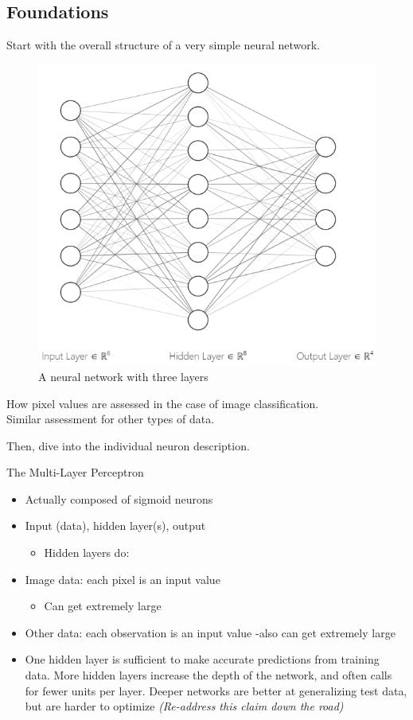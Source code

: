 

\hypertarget{foundations}{%
\subsection{Foundations}\label{foundations}}

Start with the overall structure of a very simple neural network.

\begin{figure}
    \centering
    \includegraphics[width=.4\textwidth]{ANN_files/NN_int.png}
    \caption*{\footnotesize{A neural network with three layers}}
\end{figure}

How pixel values are assessed in the case of image classification.\\
Similar assessment for other types of data.

Then, dive into the individual neuron description.

The Multi-Layer Perceptron

\begin{itemize}
\tightlist
\item
  Actually composed of sigmoid neurons
\item
  Input (data), hidden layer(s), output

  \begin{itemize}
  \tightlist
  \item
    Hidden layers do:
  \end{itemize}
\item
  Image data: each pixel is an input value

  \begin{itemize}
  \tightlist
  \item
    Can get extremely large
  \end{itemize}
\item
  Other data: each observation is an input value -also can get extremely
  large
\item
  One hidden layer is sufficient to make accurate predictions from
  training data. More hidden layers increase the depth of the network,
  and often calls for fewer units per layer. Deeper networks are better
  at generalizing test data, but are harder to optimize
  \cite{Goodfellow-et-al-2016} \emph{(Re-address this claim down the
  road)}
\end{itemize}


